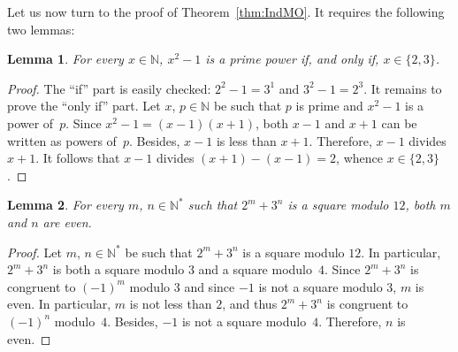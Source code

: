 \documentclass[12pt]{article}
\newcommand{\bZ}{\mathbb{Z}}
\newcommand{\bN}{\mathbb{N}} %
\newcommand{\bNast}{\bN^*}
\newtheorem{lemma}{Lemma}
\theoremstyle{definition}
\begin{document}
  
   Let us now turn to the proof of Theorem~\ref{thm:IndMO}.
   It requires the following two lemmas:

     \begin{lemma} \label{lem:x2=q+1}
       For every $x \in \bN$, $x^2 - 1$ is a prime power if, and only if, $x \in \{ 2, 3 \}$. 
     \end{lemma}

     \begin{proof}
       The ``if'' part is easily checked: $2^2 - 1 = 3^1$ and $3^2 - 1 = 2^3$. 
       It remains to prove the ``only if'' part.
       Let $x$, $p \in \bN$ be such that $p$ is prime and $x^2 - 1$ is a power of~$p$.
       Since  $x^2 - 1 = (x - 1)(x + 1)$, 
       both $x - 1$ and $x + 1$ can be written as powers of~$p$.
       Besides, $x - 1$ is less than $x + 1$.
       Therefore, $x - 1$ divides $x + 1$.
       It follows that $x - 1$ divides $(x + 1) - (x - 1) = 2$,
       whence $x \in \{ 2, 3 \}$.
    \end{proof} 
    

   
   \begin{lemma} \label{lem:2m+3n-square-mod-12}
     For every $m$, $n \in \bNast$ such that $2^m + 3^n$ is a square modulo $12$,
     both $m$ and $n$ are even.
   \end{lemma}

   \begin{proof}
     Let $m$, $n \in \bNast$ be such that $2^m + 3^n$ is a square modulo $12$.
     In particular, $2^m + 3^n$ is both a square modulo $3$ and a square modulo~$4$.
     Since $2^m + 3^n$ is congruent to ${(- 1)}^m$ modulo $3$ and since $- 1$ is not a square modulo $3$,
     $m$ is even.
     In particular, $m$ is not less than $2$, and thus $2^m + 3^n$ is congruent to ${(- 1)}^n$ modulo~$4$.
     Besides, $- 1$ is not a square modulo~$4$.
     Therefore, $n$ is even.
   \end{proof}
\end{document}
